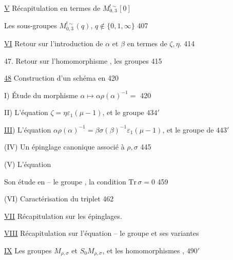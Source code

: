 \uline{V} Récapitulation en termes de \(M_{0,3}^{!\sim}[0]\)
\hfill {}

Les sous-groupes \(M_{0,3}^{!\sim}(q)\), \(q\notin\{0,1,\infty\}\) \hfill 407

\uline{VI} Retour sur l'introduction de \(\alpha\) et \(\beta\) en termes de \(\zeta,\eta\). \hfill 414

47. Retour sur l'homomorphisme
,
les groupes 
\hfill {} 415

\uline{48} Construction d'un schéma en  \hfill 420

I) Étude du morphisme \(\alpha\mapsto\alpha\rho(\alpha)^{-1}=\)\unsure{\([\alpha,\rho]\)} \hfill 420

II) L'équation \(\zeta=\eta\varepsilon_1(\mu-1)\), et le groupe
 \hfill \(434'\)

\uline{III}) L'équation \(\alpha\rho(\alpha)^{-1}=\beta\sigma(\beta)^{-1}\varepsilon_1(\mu-1)\),
et le groupe  de  \hfill \(443'\)

(IV) Un épinglage canonique associé à \(\rho,\sigma\) \hfill 445

(V) L'équation 
\hfill {}

\unsure{\(\varepsilon\)} Son étude en
 --
le groupe , la condition \(\mathrm{Tr}\,\sigma=0\) \hfill 459

(VI) Caractérisation  du triplet  \hfill 462

\uline{VII} Récapitulation sur les épinglages. \hfill {}

\uline{VIII} Récapitulation sur l'équation -- le groupe
 et ses variantes \hfill {}

\uline{IX} Les groupes \(M_{\rho,\sigma}\) et \(S_0M_{\rho,\sigma}\), et les homomorphismes
,
 \hfill \(490'\)

